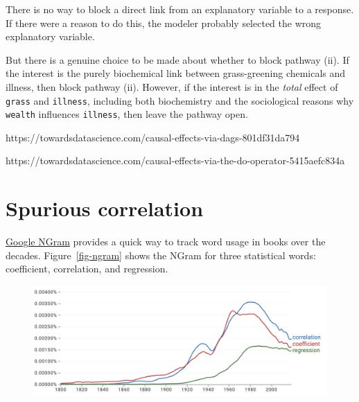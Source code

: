 \documentclass[
  letterpaper,
  DIV=11,
  numbers=noendperiod,
  oneside]{scrreprt}
\begin{document}
There is no way to block a direct link from an explanatory variable to a
response. If there were a reason to do this, the modeler probably
selected the wrong explanatory variable.

But there is a genuine choice to be made about whether to block pathway
(ii). If the interest is the purely biochemical link between
grass-greening chemicals and illness, then block pathway (ii). However,
if the interest is in the \emph{total} effect of \texttt{grass} and
\texttt{illness}, including both biochemistry and the sociological
reasons why \texttt{wealth} influences \texttt{illness}, then leave the
pathway open.

\begin{tcolorbox}[enhanced jigsaw, colbacktitle=quarto-callout-warning-color!10!white, breakable, opacitybacktitle=0.6, colback=white, left=2mm, arc=.35mm, colframe=quarto-callout-warning-color-frame, coltitle=black, toprule=.15mm, opacityback=0, leftrule=.75mm, bottomtitle=1mm, toptitle=1mm, titlerule=0mm, title=\textcolor{quarto-callout-warning-color}{\faExclamationTriangle}\hspace{0.5em}{In draft: Some resources}, rightrule=.15mm, bottomrule=.15mm]

https://towardsdatascience.com/causal-effects-via-dags-801df31da794

https://towardsdatascience.com/causal-effects-via-the-do-operator-5415aefc834a

\end{tcolorbox}

\hypertarget{sec-lesson-31}{%
\chapter{Spurious correlation}\label{sec-lesson-31}}

\href{https://books.google.com/ngrams}{Google NGram} provides a quick
way to track word usage in books over the decades.
Figure~\ref{fig-ngram} shows the NGram for three statistical words:
coefficient, correlation, and regression.

\begin{figure}


{\centering \includegraphics[width=4.98in,height=\textheight]{./www/correlation-ngram.png}

}

\end{figure}
\end{document}
